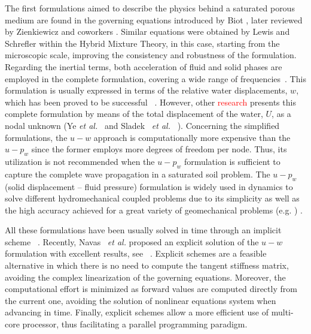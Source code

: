 \documentclass[twocolumn]{svjour3}          %
\newcommand{\etal}{
  \textit{et al.}
}
\begin{document}
The first formulations aimed to describe the physics behind a saturated porous medium are found in the governing equations introduced by Biot \cite{Biot1956}, later reviewed by Zienkiewicz and coworkers \cite{Zienkiewicz99,zienkiewicz1980,zienkiewicz1984,zienkiewicz1990a}. Similar equations were obtained by Lewis and Schrefler \cite{LewisSchrefler98} within the Hybrid Mixture Theory, in this case, starting from the microscopic scale, improving the consistency and robustness of the formulation. Regarding the inertial terms, both acceleration of fluid and solid phases are employed in the complete formulation, covering a wide range of frequencies~\cite{Jeremic08,Muraleetharan09}. This formulation is usually expressed in terms of the relative water displacements, $w$, which has been proved to be successful ~\cite{LopezQuerolB2006,Navas2016}. However, other \textcolor{red}{research} presents this complete formulation by means of the total displacement of the water, $U$, as a nodal unknown (Ye {\it et al.}~\cite{Ye2014} and Sladek~\etal~\cite{Sladek2014}). Concerning the simplified formulations, the $u-w$ approach is computationally more expensive than the $u-p_w$ since the former employs more degrees of freedom per node. Thus, its utilization is not recommended when the $u-p_w$ formulation is sufficient to capture the complete wave propagation in a saturated soil problem. 
The $u-p_w$ (solid displacement -- fluid pressure) formulation is widely used in dynamics to solve different hydromechanical coupled problems due to its simplicity as well as the high accuracy achieved for a great variety of geomechanical problems (e.g. \cite{CaoSanavia:16,zienkiewicz1990a,Zienkiewicz99}) . 


 All these formulations have been usually solved in time through an implicit scheme ~\cite{borja95,borja98,Armero99,Ehlers:99,Navas:17c}. Recently, Navas~\etal proposed an explicit solution of the $u-w$ formulation with excellent results, see ~\cite{Navas:17b}. Explicit schemes are a feasible alternative in which there is no need to compute the tangent stiffness matrix, avoiding the complex linearization of the governing equations. Moreover, the computational effort is minimized as forward values are computed directly from the current one, avoiding the solution of nonlinear equations system when advancing in time. Finally, explicit schemes allow  a more efficient use of multi-core processor, thus facilitating a parallel programming paradigm.
\end{document}
